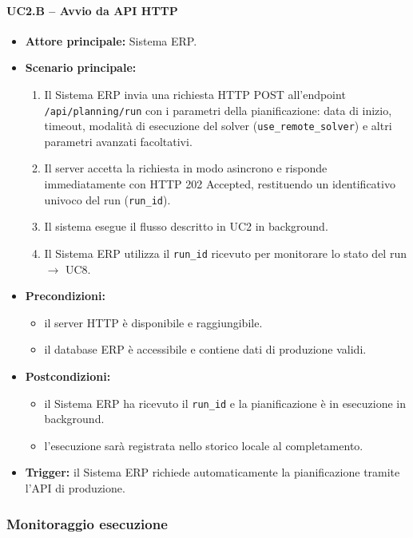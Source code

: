 \paragraph{UC2.B -- Avvio da API HTTP}
\begin{itemize}
    \item \textbf{Attore principale:} Sistema ERP.
    \item \textbf{Scenario principale:}
    \begin{enumerate}
        \item Il Sistema ERP invia una richiesta HTTP POST all'endpoint \texttt{/api/planning/run} con i parametri della pianificazione: data di inizio, timeout, modalità di esecuzione del solver (\texttt{use\_remote\_solver}) e altri parametri avanzati facoltativi.
        \item Il server accetta la richiesta in modo asincrono e risponde immediatamente con HTTP 202 Accepted, restituendo un identificativo univoco del run (\texttt{run\_id}).
        \item Il sistema esegue il flusso descritto in UC2 in background.
        \item Il Sistema ERP utilizza il \texttt{run\_id} ricevuto per monitorare lo stato del run $\rightarrow$ UC8.
    \end{enumerate}
    \item \textbf{Precondizioni:}
    \begin{itemize}
        \item il server HTTP è disponibile e raggiungibile.
        \item il database ERP è accessibile e contiene dati di produzione validi.
    \end{itemize}
    \item \textbf{Postcondizioni:}
    \begin{itemize}
        \item il Sistema ERP ha ricevuto il \texttt{run\_id} e la pianificazione è in esecuzione in background.
        \item l'esecuzione sarà registrata nello storico locale al completamento.
    \end{itemize}
    \item \textbf{Trigger:} il Sistema ERP richiede automaticamente la pianificazione tramite l'API di produzione.
\end{itemize}

\subsubsection{Monitoraggio esecuzione}


